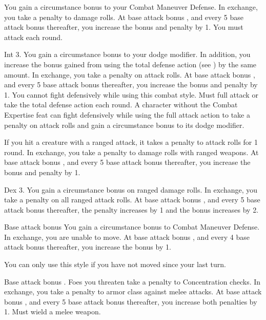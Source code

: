  You gain a  circumstance bonus to your Combat Maneuver Defense. In exchange, you take a  penalty to damage rolls. At base attack bonus , and every 5 base attack bonus thereafter, you increase the bonus and penalty by 1.
 You must attack each round.

 Int 3.
 You gain a  circumstance bonus to your dodge modifier. In addition, you increase the bonus gained from using the total defense action (see ) by the same amount. In exchange, you take a  penalty on attack rolls. At base attack bonus , and every 5 base attack bonus thereafter, you increase the bonus and penalty by 1. You cannot fight defensively while using this combat style.
 Must full attack or take the total defense action each round.
 A character without the Combat Expertise feat can fight defensively while using the full attack action to take a  penalty on attack rolls and gain a  circumstance bonus to its dodge modifier.

 If you hit a creature with a ranged attack, it takes a  penalty to attack rolls for 1 round. In exchange, you take a  penalty to damage rolls with ranged weapons. At base attack bonus , and every 5 base attack bonus thereafter, you increase the bonus and penalty by 1.

 Dex 3.
 You gain a  circumstance bonus on ranged damage rolls. In exchange, you take a  penalty on all ranged attack rolls. At base attack bonus , and every 5 base attack bonus thereafter, the penalty increases by 1 and the bonus increases by 2.

 Base attack bonus 
 You gain a  circumstance bonus to Combat Maneuver Defense. In exchange, you are unable to move. At base attack bonus , and every 4 base attack bonus thereafter, you increase the bonus by 1.

You can only use this style if you have not moved since your last turn.

 Base attack bonus .
 Foes you threaten take a  penalty to Concentration checks. In exchange, you take a  penalty to armor class against melee attacks. At base attack bonus , and every 5 base attack bonus thereafter, you increase both penalties by 1.
 Must wield a melee weapon.

